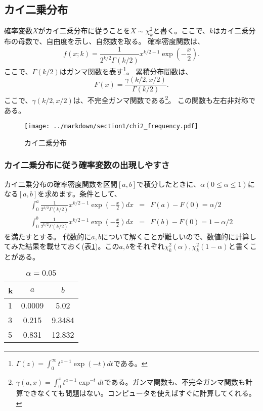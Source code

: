 \documentclass[a4paper,11pt,dvipdfmx]{jsarticle}
\begin{document}
\subsection{カイ二乗分布}
確率変数$X$がカイ二乗分布に従うことを$X \sim \chi^2_k$と書く。ここで、$k$はカイ二乗分布の母数で、自由度を示し、自然数を取る。
確率密度関数は、
\begin{equation*}
    f(x;k) = \frac{1}{2^{k/2}\Gamma(k/2)}x^{k/2-1}\exp\left(-\frac{x}{2}\right).
\end{equation*}
ここで、$\Gamma(k/2)$はガンマ関数を表す\footnote{$ \Gamma(z)=\int_0^{\infty }t^{z-1}\exp(-t)dt$である。 }。
累積分布間数は、
\begin{equation*}
    F(x) = \frac{\gamma(k/2,x/2)}{\Gamma(k/2)}.
\end{equation*}
ここで、$\gamma(k/2,x/2)$は、不完全ガンマ関数である\footnote{$\gamma(a,x)=\int_0^x t^{a-1}\exp^{-t}dt$である。ガンマ関数も、不完全ガンマ関数も計算できなくても問題はない。コンピュータを使えばすぐに計算してくれる。}。
この関数も左右非対称である。


\begin{figure}
    \begin{center}
        \texttt{[image: ../markdown/section1/chi2\_frequency.pdf]}
        \caption{カイ二乗分布}
        \label{chi2_}
    \end{center}
\end{figure}

\subsubsection{カイ二乗分布に従う確率変数の出現しやすさ}
カイ二乗分布の確率密度関数を区間$[a,b]$で積分したときに、$\alpha(0\leq \alpha \leq 1)$になる$[a,b]$を求めます。条件として、
\begin{eqnarray*}
    \int_0^{a}  \frac{1}{2^{k/2}\Gamma(k/2)}x^{k/2-1}\exp\left(-\frac{x}{2}\right)dx &=& F(a)-F(0) = \alpha/2\\
    \int_0^{b} \frac{1}{2^{k/2}\Gamma(k/2)}x^{k/2-1}\exp\left(-\frac{x}{2}\right)dx &=& F(b)-F(0)= 1-\alpha/2
\end{eqnarray*}
を満たすとする。
代数的に$a,b$について解くことが難しいので、数値的に計算してみた結果を載せておく(表\ref{table:chi2_confidence})。この$a,b$をそれぞれ$\chi^2_k(\alpha),\chi^2_{k}(1-\alpha)$と書くことがある。


\begin{table}[hbtp]
    \caption{$\alpha=0.05$}
    \label{table:chi2_confidence}
    \centering
    \begin{tabular}{lcc}
    k  & $a$   & $b$   \\
    \hline \hline
    1 &  0.0009 &  5.02\\
    3 & 0.215 & 9.3484  \\
    5 &  0.831 & 12.832 \\
      \hline
    \end{tabular}
  \end{table}
\end{document}
